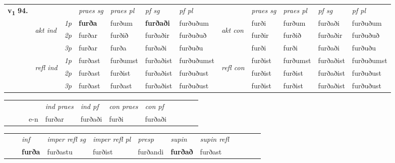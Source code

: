 \begin{tabular}{llllllllllll} \toprule
\multirow{4}{*}{{{\textbf{v{\textsubscript{1}}} \Large{\textbf{94.}}}}}  & &   &  \textit{praes sg}  & \textit{praes pl}  &\textit{ pf sg} & \textit{pf pl} &  &  \textit{praes sg}  & \textit{praes pl}  & \textit{pf sg} & \textit{pf pl } \\*
	\cmidrule{4-7} \cmidrule{9-12}
 & \multirow{3}{*}{\begin{turn}{90}\textit{akt ind}\end{turn}} & {\textit{1p}} & \textbf{furða} & furðum    & \textbf{furðaði} & furðuðum & \multirow{3}{*}{\begin{turn}{90}\textit{akt con}\end{turn}} &furði & furðum & furðaði & furðuðum\\*
& &  {\textit{2p}} &  furðar  & furðið   & furðaðir & furðuðuð & & furðir & furðið & furðaðir & furðuðuð \\*
& &  {\textit{3p}} & furðar & furða   & furðaði & furðuðu & & furði & furði& furðaði & furðuðu  \\*
\cmidrule{4-7} \cmidrule{9-12}
 &\multirow{3}{*}{\begin{turn}{90}\textit{refl ind}\end{turn}} & {\textit{1p}} & furðast & furðumst    & furðaðist & furðuðumst & \multirow{3}{*}{\begin{turn}{90}\textit{refl con}\end{turn}}  &furðist & furðumst & furðaðist & furðuðumst\\*
 &&  {\textit{2p}} &  furðast  & furðist   & furðaðist & furðuðust & &furðist & furðist & furðaðist & furðuðust \\*
& &  {\textit{3p}} & furðast & furðast   & furðaðist & furðuðust & & furðist & furðist& furðaðist & furðuðust  \\*
\cmidrule{4-7} \cmidrule{9-12}
\end{tabular}


\begin{tabular}{llllllllllll}
 & &  & &  \textit{ind praes} & \textit{ind pf} & \textit{con praes} & \textit{con pf} \\*
&  & & e-n & furðar & furðaði & furði & furðaði \\*
\cmidrule{5-9}
\end{tabular}


\begin{tabular}{llllllllllll}
 & & \textit{inf}   & \textit{imper refl sg} & \textit{imper refl pl} & \textit{presp} & \textit{supin} & \textit{supin refl}      \\*
  & & \textbf{furða}    & furðastu & furðist & furðandi &  \textbf{furðað} & furðast  \\*
\cmidrule{1-12}
\end{tabular}



